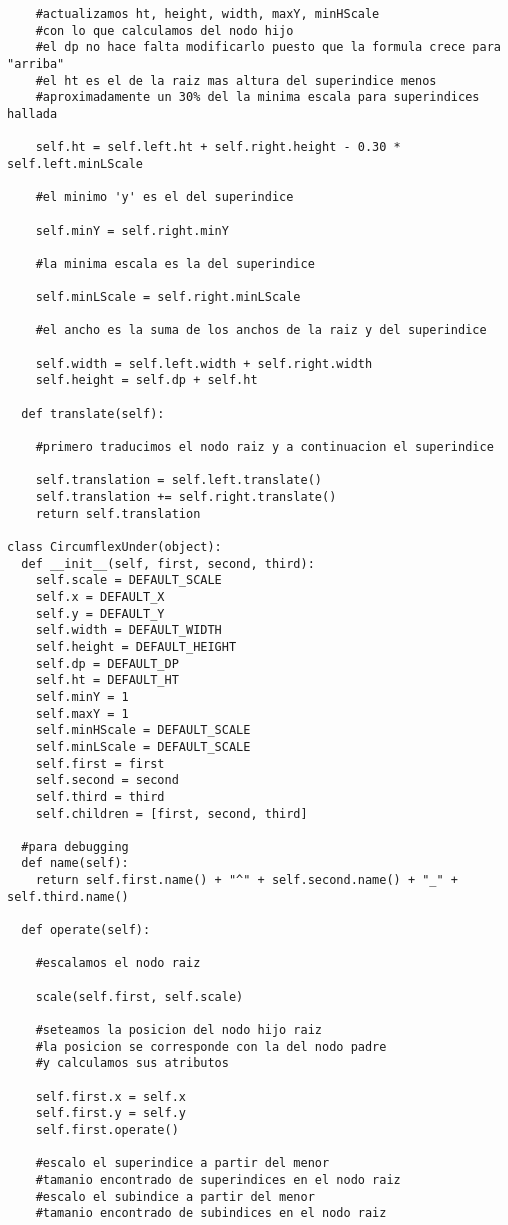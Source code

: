 \begin{verbatim}
    #actualizamos ht, height, width, maxY, minHScale 
    #con lo que calculamos del nodo hijo
    #el dp no hace falta modificarlo puesto que la formula crece para "arriba"
    #el ht es el de la raiz mas altura del superindice menos
    #aproximadamente un 30% del la minima escala para superindices hallada

    self.ht = self.left.ht + self.right.height - 0.30 * self.left.minLScale
    
    #el minimo 'y' es el del superindice
    
    self.minY = self.right.minY
    
    #la minima escala es la del superindice
    
    self.minLScale = self.right.minLScale
    
    #el ancho es la suma de los anchos de la raiz y del superindice
    
    self.width = self.left.width + self.right.width
    self.height = self.dp + self.ht
  
  def translate(self):
    
    #primero traducimos el nodo raiz y a continuacion el superindice
    
    self.translation = self.left.translate()
    self.translation += self.right.translate()
    return self.translation

class CircumflexUnder(object):
  def __init__(self, first, second, third):
    self.scale = DEFAULT_SCALE
    self.x = DEFAULT_X
    self.y = DEFAULT_Y
    self.width = DEFAULT_WIDTH
    self.height = DEFAULT_HEIGHT
    self.dp = DEFAULT_DP
    self.ht = DEFAULT_HT
    self.minY = 1
    self.maxY = 1
    self.minHScale = DEFAULT_SCALE
    self.minLScale = DEFAULT_SCALE
    self.first = first
    self.second = second
    self.third = third
    self.children = [first, second, third]

  #para debugging
  def name(self):
    return self.first.name() + "^" + self.second.name() + "_" + self.third.name()

  def operate(self):
    
    #escalamos el nodo raiz
    
    scale(self.first, self.scale)

    #seteamos la posicion del nodo hijo raiz
    #la posicion se corresponde con la del nodo padre
    #y calculamos sus atributos
    
    self.first.x = self.x
    self.first.y = self.y
    self.first.operate()

    #escalo el superindice a partir del menor 
    #tamanio encontrado de superindices en el nodo raiz
    #escalo el subindice a partir del menor 
    #tamanio encontrado de subindices en el nodo raiz


\end{verbatim}
